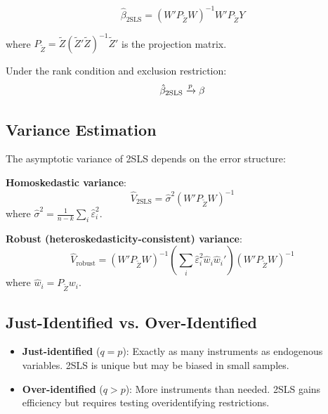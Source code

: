 \begin{equation}
\hat{\beta}_{2\text{SLS}} = (W' P_{\tilde{Z}} W)^{-1} W' P_{\tilde{Z}} Y
\label{eq:2sls_matrix}
\end{equation}

where $P_{\tilde{Z}} = \tilde{Z}(\tilde{Z}'\tilde{Z})^{-1}\tilde{Z}'$ is the projection matrix.

\begin{theorem}
\label{thm:2sls_consistency}
Under the rank condition and exclusion restriction:
\begin{equation}
\hat{\beta}_{2\text{SLS}} \xrightarrow{p} \beta
\end{equation}
\end{theorem}

\subsection{Variance Estimation}

The asymptotic variance of 2SLS depends on the error structure:

\textbf{Homoskedastic variance}:
\begin{equation}
\hat{V}_{2\text{SLS}} = \hat{\sigma}^2 (W' P_{\tilde{Z}} W)^{-1}
\end{equation}
where $\hat{\sigma}^2 = \frac{1}{n-k}\sum_i \hat{\varepsilon}_i^2$.

\textbf{Robust (heteroskedasticity-consistent) variance}:
\begin{equation}
\hat{V}_{\text{robust}} = (W' P_{\tilde{Z}} W)^{-1} \left(\sum_i \hat{\varepsilon}_i^2 \hat{w}_i \hat{w}_i'\right) (W' P_{\tilde{Z}} W)^{-1}
\end{equation}
where $\hat{w}_i = P_{\tilde{Z}} w_i$.

\subsection{Just-Identified vs. Over-Identified}

\begin{itemize}
    \item \textbf{Just-identified} ($q = p$): Exactly as many instruments as endogenous variables. 2SLS is unique but may be biased in small samples.
    \item \textbf{Over-identified} ($q > p$): More instruments than needed. 2SLS gains efficiency but requires testing overidentifying restrictions.
\end{itemize}


